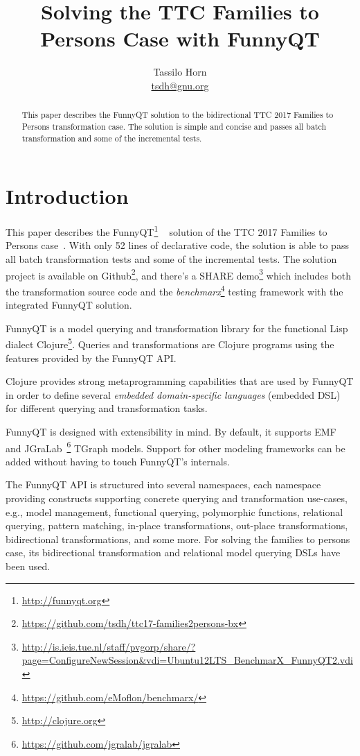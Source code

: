 \documentclass[a4paper]{article}
\title{Solving the TTC Families to Persons Case with FunnyQT}
\author{Tassilo Horn\\ \href{mailto:tsdh@gnu.org}{tsdh@gnu.org}}
\begin{document}
\maketitle

\begin{abstract}
  This paper describes the FunnyQT solution to the bidirectional TTC 2017
  Families to Persons transformation case.  The solution is simple and concise
  and passes all batch transformation and some of the incremental tests.
\end{abstract}


\section{Introduction}
\label{sec:introduction}

This paper describes the FunnyQT\footnote{\url{http://funnyqt.org}}
~\cite{diss,funnyqt-icgt15} solution of the TTC 2017 Families to Persons
case~\cite{f2p-case-desc}.  With only 52 lines of declarative code, the
solution is able to pass all batch transformation tests and some of the
incremental tests.  The solution project is available on
Github\footnote{\url{https://github.com/tsdh/ttc17-families2persons-bx}}, and
there's a SHARE
demo\footnote{\url{http://is.ieis.tue.nl/staff/pvgorp/share/?page=ConfigureNewSession&vdi=Ubuntu12LTS_BenchmarX_FunnyQT2.vdi}}
which includes both the transformation source code and the
\emph{benchmarx}\footnote{\url{https://github.com/eMoflon/benchmarx/}} testing
framework with the integrated FunnyQT solution.


FunnyQT is a model querying and transformation library for the functional Lisp
dialect Clojure\footnote{\url{http://clojure.org}}.  Queries and
transformations are Clojure programs using the features provided by the FunnyQT
API.

Clojure provides strong metaprogramming capabilities that are used by FunnyQT
in order to define several \emph{embedded domain-specific languages} (embedded
DSL) for different querying and transformation tasks.

FunnyQT is designed with extensibility in mind.  By default, it supports
EMF~\cite{Steinberg2008EEM} and
JGraLab~\footnote{\url{https://github.com/jgralab/jgralab}} TGraph models.
Support for other modeling frameworks can be added without having to touch
FunnyQT's internals.

The FunnyQT API is structured into several namespaces, each namespace providing
constructs supporting concrete querying and transformation use-cases, e.g.,
model management, functional querying, polymorphic functions, relational
querying, pattern matching, in-place transformations, out-place
transformations, bidirectional transformations, and some more.  For solving the
families to persons case, its bidirectional transformation and relational model
querying DSLs have been used.
\end{document}
